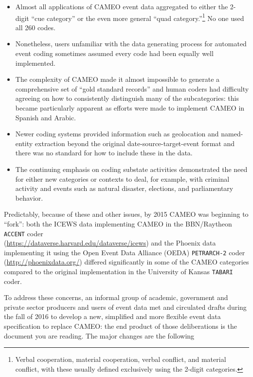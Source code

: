 \documentclass[11pt]{report}
\newcommand{\txt}[1]{\texttt{#1}}
\newcommand{\fn}[1]{\footnote{#1}}
\begin{document}
\begin{itemize}
\item Almost all applications of CAMEO event data aggregated to either the 2-digit ``cue category'' or the even more general ``quad category.''\fn{Verbal cooperation, material cooperation, verbal conflict, and material conflict, with these usually defined exclusively using the 2-digit categories.} No one used all 260 codes.
\item Nonetheless, users unfamiliar with the data generating process for automated event coding sometimes assumed every code had been equally well implemented.
\item The complexity of CAMEO made it almost impossible to generate a comprehensive set of ``gold standard records'' and human coders had difficulty agreeing on how to consistently distinguish many of the subcategories: this became particularly apparent as efforts were made to implement CAMEO in Spanish and Arabic.
\item Newer coding systems provided information such as geolocation and named-entity extraction beyond the original date-source-target-event format and there was no standard for how to include these in the data.
\item The continuing emphasis on coding substate activities demonstrated the need for either new categories or contexts to deal, for example, with criminal activity and events such as natural disaster, elections, and parliamentary behavior.
\end{itemize}

Predictably, because of these and other issues, by 2015 CAMEO was beginning to ``fork'': both the ICEWS data implementing CAMEO in the BBN/Raytheon \txt{ACCENT} coder \\ (\url{https://dataverse.harvard.edu/dataverse/icews}) and the Phoenix data implementing it using the Open Event Data Alliance (OEDA) \txt{PETRARCH-2} coder  (\url{http://phoenixdata.org/}) differed significantly in some of the CAMEO categories compared to the original implementation in the University of Kansas \txt{TABARI} coder. 

To address these concerns, an informal group of academic, government and private sector producers and users of event data met and circulated drafts during the fall of 2016 to develop a new, simplified and more flexible event data specification to replace CAMEO: the end product of those deliberations is the document you are reading. The major changes are the following
\end{document}
